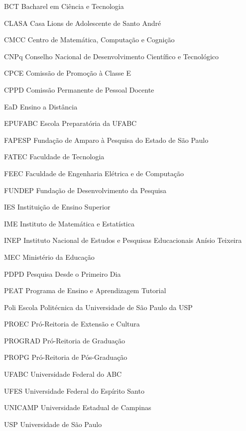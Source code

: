 \begin{siglas}
  \item[BCT] Bacharel em Ciência e Tecnologia
  \item[CLASA] Casa Lions de Adolescente de Santo André
  \item[CMCC] Centro de Matemática, Computação e Cognição
  \item[CNPq] Conselho Nacional de Desenvolvimento Científico e Tecnológico
  \item[CPCE] Comissão de Promoção à Classe E
  \item[CPPD] Comissão Permanente de Pessoal Docente 
  \item[EaD] Ensino a Distância
  \item[EPUFABC] Escola Preparatória da UFABC
  \item[FAPESP] Fundação de Amparo à Pesquisa do Estado de São Paulo
  \item[FATEC] Faculdade de Tecnologia
  \item[FEEC] Faculdade de Engenharia Elétrica e de Computação
  \item[FUNDEP] Fundação de Desenvolvimento da Pesquisa
  \item[IES] Instituição de Ensino Superior
  \item[IME] Instituto de Matemática e Estatística
  \item[INEP] Instituto Nacional de Estudos e Pesquisas Educacionais Anísio Teixeira
  \item[MEC] Ministério da Educação
  \item[PDPD] Pesquisa Desde o Primeiro Dia
  \item[PEAT] Programa de Ensino e Aprendizagem Tutorial
  \item[Poli] Escola Politécnica da Universidade de São Paulo da USP
  \item[PROEC] Pró-Reitoria de Extensão e Cultura
  \item[PROGRAD] Pró-Reitoria de Graduação
  \item[PROPG] Pró-Reitoria de Pós-Graduação
  \item[UFABC] Universidade Federal do ABC
  \item[UFES] Universidade Federal do Espírito Santo
  \item[UNICAMP] Universidade Estadual de Campinas
  \item[USP] Universidade de São Paulo
\end{siglas}

